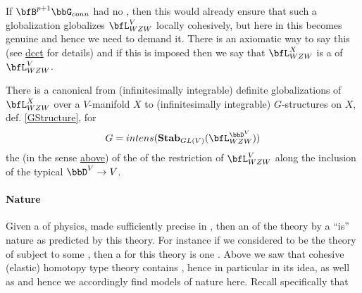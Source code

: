 If $\bfB^{p+1}\bbG_{conn}$ had no , then this would already ensure that such a globalization globalizes $\bfL_{WZW}^V$ locally cohesively, but here in  this  becomes genuine  and hence we need to demand it. There is an axiomatic way to say this (see \hyperlink{dcct}{dcct} for details) and if this is imposed then we say that $\bfL_{WZW}^X$ is a  of $\bfL_{WZW}^V$.
\begin{prop}
\label{DefiniteGlobalizationsToGStructure}\hypertarget{DefiniteGlobalizationsToGStructure}{}
There is a canonical  from (infinitesimally integrable) definite globalizations of $\bfL_{WZW}^X$ over a $V$-manifold $X$ to (infinitesimally integrable) $G$-structures on $X$, def. \ref{GStructure}, for
\begin{displaymath}
G = intens(\mathbf{Stab}_{GL(V)}(\bfL_{WZW}^{\bbD^V}))
\end{displaymath}
the  (in the sense \hyperlink{IntensiveExtensive}{above}) of the  of the restriction of $\bfL_{WZW}^V$ along the inclusion of the typical  $\bbD^V \to V$.
\end{prop}
\hypertarget{nature}{}\paragraph*{{Nature}}\label{nature}
Given a  of physics, made sufficiently precise in , then an  of the theory by a  ``is'' nature as predicted by this theory.
For instance if we considered  to be the theory of  subject to some , then a  for this theory is one  .
Above we saw that cohesive (elastic) homotopy type theory contains , hence in particular  in its idea, as well as  and hence we accordingly find models of nature here.
Recall specifically that
